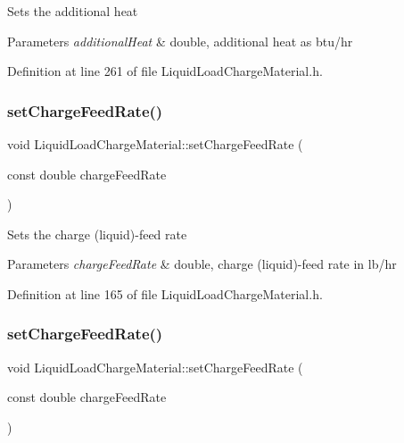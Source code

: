 Sets the additional heat 
\begin{DoxyParams}{Parameters}
{\em additional\+Heat} & double, additional heat as btu/hr \\
\hline
\end{DoxyParams}


Definition at line 261 of file Liquid\+Load\+Charge\+Material.\+h.

\mbox{\label{class_liquid_load_charge_material_a23d6aa6f15a124ddb1504261347b0b82}} 
\subsubsection{\texorpdfstring{set\+Charge\+Feed\+Rate()}{setChargeFeedRate()}\hspace{0.1cm}{\footnotesize\ttfamily [1/3]}}
{\footnotesize\ttfamily void Liquid\+Load\+Charge\+Material\+::set\+Charge\+Feed\+Rate (\begin{DoxyParamCaption}\item[{const double}]{charge\+Feed\+Rate }\end{DoxyParamCaption})\hspace{0.3cm}{\ttfamily [inline]}}

Sets the charge (liquid)-\/feed rate 
\begin{DoxyParams}{Parameters}
{\em charge\+Feed\+Rate} & double, charge (liquid)-\/feed rate in lb/hr \\
\hline
\end{DoxyParams}


Definition at line 165 of file Liquid\+Load\+Charge\+Material.\+h.

\mbox{\label{class_liquid_load_charge_material_a23d6aa6f15a124ddb1504261347b0b82}} 
\subsubsection{\texorpdfstring{set\+Charge\+Feed\+Rate()}{setChargeFeedRate()}\hspace{0.1cm}{\footnotesize\ttfamily [2/3]}}
{\footnotesize\ttfamily void Liquid\+Load\+Charge\+Material\+::set\+Charge\+Feed\+Rate (\begin{DoxyParamCaption}\item[{const double}]{charge\+Feed\+Rate }\end{DoxyParamCaption})\hspace{0.3cm}{\ttfamily [inline]}}

